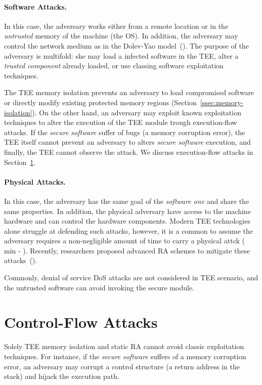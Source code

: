 \paragraph{Software Attacks.} 
In this case, the adversary works either from a remote location or in the 
\emph{untrusted} memory of the machine (\eg the OS).
In addition, the adversary may control the network medium as in the Dolev-Yao 
model~(\cite{dolev}).
The purpose of the adversary is multifold: she may load a infected software in 
the TEE, alter a \emph{trusted component} already loaded, or use classing 
software exploitation techniques.

The TEE memory isolation prevents an adversary to load compromised software or 
directly modify existing protected memory regions 
(Section~\ref{ssec:memory-isolation}).
On the other hand, an adversary may exploit known exploitation techniques to 
alter the execution of the TEE module trough execution-flow attacks.
If the \emph{secure software} suffer of bugs (\eg a memory corruption error), 
the TEE itself cannot prevent an adversary to alters \emph{secure software} 
execution, and finally, the TEE cannot observe the attack.
We discuss execution-flow attacks in Section~\ref{sec:control-flow-attacks}.

\paragraph{Physical Attacks.}
In this case, the adversary has the same goal of the \emph{software 
one} and share the same properties. In addition, the physical adversary have 
access to the machine hardware and can control the hardware components.
Modern TEE technologies alone struggle at defending such attacks, however, it 
is a common to assume the adversary requires a non-negligible amount of time to 
carry a physical attck (
min - 
\cite{conti2010smallville,conti2008emergent,darpa,ibrahim2017seed,pasta,us-aid}).
Recently, researchers proposed advanced RA schemes to mitigate these 
attacks~(\cite{darpa,visintin2019safe,pasta}).

Commonly, denial of service DoS attacks are not considered in TEE scenario, and 
the untrusted software can avoid invoking the secure module.

\section{Control-Flow Attacks}
\label{sec:control-flow-attacks}

Solely TEE memory isolation and static RA cannot avoid classic exploitation 
techniques.
For instance, if the \emph{secure software} suffers of a memory corruption 
error, an adversary may corrupt a control structure (\ie a return address in 
the stack) and hijack the execution path.

